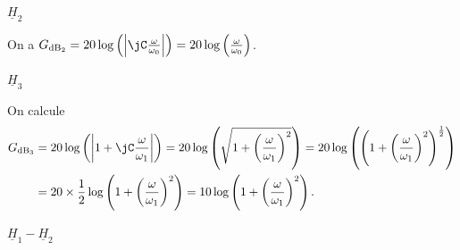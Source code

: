 


\begin{enonce}
	$\underline{H}_2$
\end{enonce}


\begin{corrige}
	On a $G_{\text{dB}_{2}}
	=20\log\left(\left|  \jC \frac{ \omega}{\omega_0} \right| \right)
	=20\log\left( \frac{ \omega}{\omega_0}  \right)$.	
\end{corrige}




\begin{enonce}
	$\underline{H}_3$
\end{enonce}

	
\begin{corrige}
On calcule \minusSmallskip
		\begin{align*}
		G_{\text{dB}_{3}} &=20\log\left(\left| 1+\jC \frac{\omega}{\omega_1} \right| \right)=20\log\left(\sqrt{1+ \left( \frac{\omega}{\omega_1} \right)^2}\right) = 20\log\left(\left( 1+ \left( \frac{\omega}{\omega_1} \right)^2\right)^{\frac{1}{2}} \right)\\
		&= 20 \times \frac{1}{2} \log\left( 1+ \left( \frac{\omega}{\omega_1} \right)^2\right) =  10\log\left( 1+ \left( \frac{\omega}{\omega_1} \right)^2\right).
		\end{align*}
\end{corrige}




\begin{enonce}
	$\underline{H}_1-\underline{H}_2$
\end{enonce}


